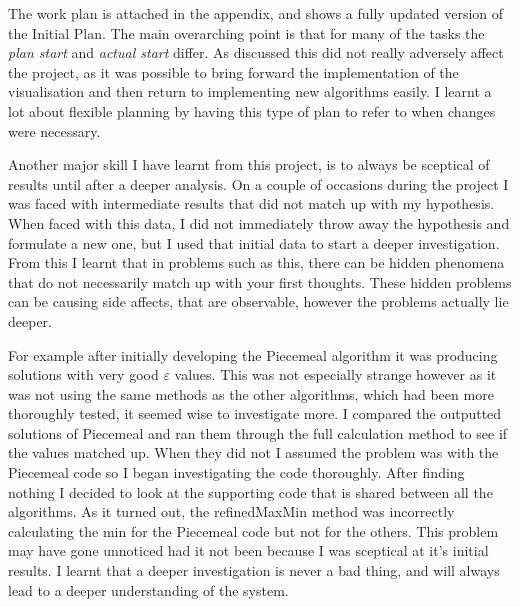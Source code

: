 \documentclass[12pt]{report}
\begin{document}
The work plan is attached in the appendix, and shows a fully updated version of the Initial Plan. The main overarching point is that for many of the tasks the \textit{plan start} and \textit{actual start} differ. As discussed this did not really adversely affect the project, as it was possible to bring forward the implementation of the visualisation and then return to implementing new algorithms easily. I learnt a lot about flexible planning by having this type of plan to refer to when changes were necessary.

Another major skill I have learnt from this project, is to always be sceptical of results until after a deeper analysis. On a couple of occasions during the project I was faced with intermediate results that did not match up with my hypothesis. When faced with this data, I did not immediately throw away the hypothesis and formulate a new one, but I used that initial data to start a deeper investigation. From this I learnt that in problems such as this, there can be hidden phenomena that do not necessarily match up with your first thoughts. These hidden problems can be causing side affects, that are observable, however the problems actually lie deeper. 

For example after initially developing the Piecemeal algorithm it was producing solutions with very good $\varepsilon$ values. This was not especially strange however as it was not using the same methods as the other algorithms, which had been more thoroughly tested, it seemed wise to investigate more. I compared the outputted solutions of Piecemeal and ran them through the full calculation method to see if the values matched up. When they did not I assumed the problem was with the Piecemeal code so I began investigating the code thoroughly. After finding nothing I decided to look at the supporting code that is shared between all the algorithms. As it turned out, the refinedMaxMin method was incorrectly calculating the min for the Piecemeal code but not for the others. This problem may have gone unnoticed had it not been because I was sceptical at it's initial results. I learnt that a deeper investigation is never a bad thing, and will always lead to a deeper understanding of the system.

\clearpage
\end{document}

